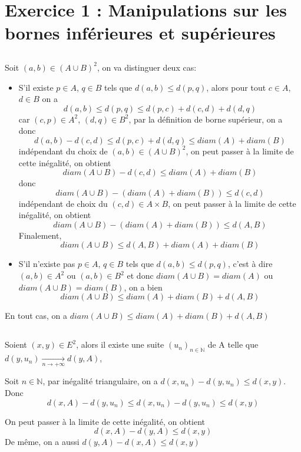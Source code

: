 \documentclass[a4paper,12pt]{book}
\begin{document}
\renewcommand{\labelitemi}{$\blacktriangleright$}
\renewcommand{\labelitemii}{$\bullet$}


\section{Exercice 1 : Manipulations sur les bornes inférieures et supérieures}
\subsection{}
Soit $(a,b) \in (A \cup B)^2$, on va distinguer deux cas:
\begin{itemize}
    \item S'il existe $p \in A$, $q \in B$ tels que $d(a,b)\leq d(p,q)$, alors pour tout
    $c \in A$, $d \in B$ on a 
    $$
    d(a,b)\leq d(p,q) \leq d(p,c)+d(c,d)+d(d,q) 
    $$
    car $(c,p) \in A^2$, $(d,q) \in B^2$, par la définition de borne supérieur, on a donc 
    $$
    d(a,b)-d(c,d) \leq d(p,c)+d(d,q)\leq diam(A)+diam(B)
    $$
    indépendant du choix de $(a,b)\in (A \cup B)^2$, on peut passer à la limite de cette inégalité, on obtient 
    $$
    diam(A \cup B)-d(c,d)\leq diam(A)+diam(B)
    $$
    donc 
    $$
    diam(A \cup B)-(diam(A)+diam(B)) \leq d(c,d)
    $$
    indépendant de choix du $(c,d)\in A\times B$, on peut passer à la limite de cette inégalité, on obtient 
    $$
    diam(A \cup B)- (diam(A)+diam(B)) \leq d(A,B)
    $$
    Finalement, 
    $$
    diam(A \cup B) \leq d(A,B)+diam(A)+diam(B)
    $$
    \item S'il n'existe pas $p \in A$, $q \in B$ tels que $d(a,b)\leq d(p,q)$, c'est à dire 
    $(a,b) \in A^2$ ou $(a,b) \in B^2$ et donc $diam(A \cup B)= diam(A)$ ou $diam(A \cup B)= diam(B)$, 
    on a bien 
    $$
    diam(A \cup B)\leq diam(A)+diam(B)+d(A,B)
    $$
\end{itemize}
En tout cas, on a $\boxed{diam(A \cup B)\leq diam(A)+diam(B)+d(A,B)}$

\subsection{}
Soient $(x,y) \in E^2$, alors il existe une suite $(u_n)_{n \in \mathbb{N}}$ de A telle que $d(y,u_n)\xrightarrow[n \to +\infty]{}d(y,A)$, 

Soit $n \in \mathbb{N}$, par inégalité triangulaire,  on a $d(x,u_n)-d(y,u_n)\leq d(x,y)$. Donc 
$$d(x,A)-d(y,u_n)\leq d(x,u_n)-d(y,u_n)\leq d(x,y)$$

On peut passer à la limite de cette inégalité, on obtient
$$
d(x,A)-d(y,A)\leq d(x,y)
$$
De même, on a aussi $d(y,A)-d(x,A)\leq d(x,y)$
\end{document}
